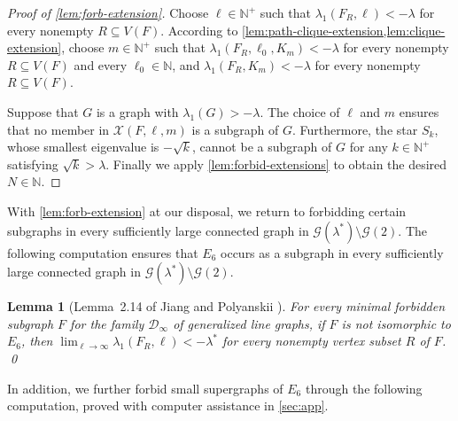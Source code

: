 \documentclass[11pt]{article}
\newtheorem{lemma}[theorem]{Lemma}
\theoremstyle{definition}
\theoremstyle{remark}
\newcommand{\la}{\lambda}
\newcommand{\las}{\lambda^*}
\newcommand{\D}{\mathcal{D}}
\newcommand{\G}{\mathcal{G}}
\newcommand{\N}{\mathbb{N}}
\newcommand{\X}{\mathcal{X}}
\begin{document}
\begin{proof}[Proof of \cref{lem:forb-extension}]
    Choose $\ell \in \N^+$ such that $\la_1(F_R, \ell) < -\la$ for every nonempty $R \subseteq V(F)$. According to \cref{lem:path-clique-extension,lem:clique-extension}, choose $m \in \N^+$ such that $\la_1(F_R, \ell_0, K_m) < -\la$ for every nonempty $R \subseteq V(F)$ and every $\ell_0 \in \N$, and $\la_1(F_R, K_m) < -\la$ for every nonempty $R \subseteq V(F)$.
    
    Suppose that $G$ is a graph with $\la_1(G) > -\la$. The choice of $\ell$ and $m$ ensures that no member in $\X(F, \ell, m)$ is a subgraph of $G$. Furthermore, the star $S_k$, whose smallest eigenvalue is $-\sqrt{k}$, cannot be a subgraph of $G$ for any $k \in \N^+$ satisfying $\sqrt{k} > \la$. Finally we apply \cref{lem:forbid-extensions} to obtain the desired $N \in \N$.
\end{proof}

With \cref{lem:forb-extension} at our disposal, we return to forbidding certain subgraphs in every sufficiently large connected graph in $\G(\las)\setminus \G(2)$. The following computation ensures that $E_6$ occurs as a subgraph in every sufficiently large connected graph in $\G(\las) \setminus \G(2)$.

\begin{lemma}[Lemma~2.14 of Jiang and Polyanskii \cite{JP25}] \label{lem:computation}
    For every minimal forbidden subgraph $F$ for the family $\D_\infty$ of generalized line graphs, if $F$ is not isomorphic to $E_6$, then $\lim_{\ell \to \infty} \la_1(F_R, \ell) < -\las$ for every nonempty vertex subset $R$ of $F$. \qed
\end{lemma}

In addition, we further forbid small supergraphs of $E_6$ through the following computation, proved with computer assistance in \cref{sec:app}.
\end{document}
